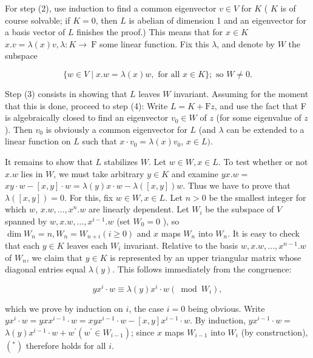 \documentclass[10pt]{article}
\begin{document}
For step (2), use induction to find a common eigenvector $v \in V$ for $K$ ( $K$ is of course solvable; if $K=0$, then $L$ is abelian of dimension 1 and an eigenvector for a basis vector of $L$ finishes the proof.) This means that for $x \in K$\\
$x . v=\lambda(x) v, \lambda: K \rightarrow \mathrm{~F}$ some linear function. Fix this $\lambda$, and denote by $W$ the subspace

$$
\{w \in V \mid x . w=\lambda(x) w, \text { for all } x \in K\} ; \text { so } W \neq 0 .
$$

Step (3) consists in showing that $L$ leaves $W$ invariant. Assuming for the moment that this is done, proceed to step (4): Write $L=K+\mathrm{F} z$, and use the fact that F is algebraically closed to find an eigenvector $v_{0} \in W$ of $z$ (for some eigenvalue of $z$ ). Then $v_{0}$ is obviously a common eigenvector for $L$ (and $\lambda$ can be extended to a linear function on $L$ such that $x \cdot v_{0}=\lambda(x) v_{0}$, $x \in L)$.

It remains to show that $L$ stabilizes $W$. Let $w \in W, x \in L$. To test whether or not $x . w$ lies in $W$, we must take arbitrary $y \in K$ and examine $y x . w=$ $x y \cdot w-[x, y] \cdot w=\lambda(y) x \cdot w-\lambda([x, y]) w$. Thus we have to prove that $\lambda([x, y])=0$. For this, fix $w \in W, x \in L$. Let $n>0$ be the smallest integer for which $w$, $x . w, \ldots, x^{n} . w$ are linearly dependent. Let $W_{i}$ be the subspace of $V$ spanned by $w, x . w, \ldots, x^{i-1} . w$ (set $W_{0}=0$ ), so $\operatorname{dim} W_{n}=n, W_{n}=W_{n+i}(i \geq 0)$ and $x$ maps $W_{n}$ into $W_{n}$. It is easy to check that each $y \in K$ leaves each $W_{i}$ invariant. Relative to the basis $w, x . w, \ldots, x^{n-1} . w$ of $W_{n}$, we claim that $y \in K$ is represented by an upper triangular matrix whose diagonal entries equal $\lambda(y)$. This follows immediately from the congruence:


\begin{equation*}
y x^{i} \cdot w \equiv \lambda(y) x^{i} \cdot w\left(\bmod W_{i}\right), \tag{*}
\end{equation*}


which we prove by induction on $i$, the case $i=0$ being obvious. Write $y x^{i} \cdot w=y x x^{i-1} \cdot w=x y x^{i-1} \cdot w-[x, y] x^{i-1} \cdot w$. By induction, $y x^{i-1} \cdot w=$ $\lambda(y) x^{i-1} \cdot w+w^{\prime}\left(w^{\prime} \in W_{i-1}\right)$; since $x$ maps $W_{i-1}$ into $W_{i}$ (by construction), $\left(^{*}\right)$ therefore holds for all $i$.
\end{document}
